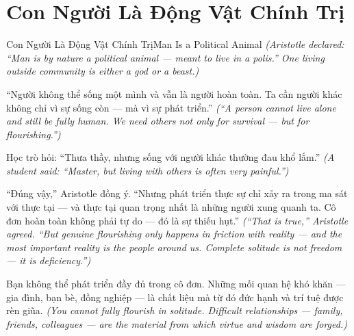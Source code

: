 \section{Con Người Là Động Vật Chính Trị}
\begin{truyen}{Con Người Là Động Vật Chính Trị}{Man Is a Political Animal}
\textit{(Aristotle declared: ``Man is by nature a political animal — meant to live in a polis.'' One living outside community is either a god or a beast.)}

``Người không thể sống một mình và vẫn là người hoàn toàn. Ta cần người khác không chỉ vì sự sống còn — mà vì sự phát triển.''
\textit{(``A person cannot live alone and still be fully human. We need others not only for survival — but for flourishing.'')}

Học trò hỏi: ``Thưa thầy, nhưng sống với người khác thường đau khổ lắm.''
\textit{(A student said: ``Master, but living with others is often very painful.'')}

``Đúng vậy,'' Aristotle đồng ý. ``Nhưng phát triển thực sự chỉ xảy ra trong ma sát với thực tại — và thực tại quan trọng nhất là những người xung quanh ta. Cô đơn hoàn toàn không phải tự do — đó là sự thiếu hụt.''
\textit{(``That is true,'' Aristotle agreed. ``But genuine flourishing only happens in friction with reality — and the most important reality is the people around us. Complete solitude is not freedom — it is deficiency.'')}

\end{truyen}

\begin{baihoc}
Bạn không thể phát triển đầy đủ trong cô đơn. Những mối quan hệ khó khăn — gia đình, bạn bè, đồng nghiệp — là chất liệu mà từ đó đức hạnh và trí tuệ được rèn giũa.
\textit{(You cannot fully flourish in solitude. Difficult relationships — family, friends, colleagues — are the material from which virtue and wisdom are forged.)}
\end{baihoc}
\ngancach


